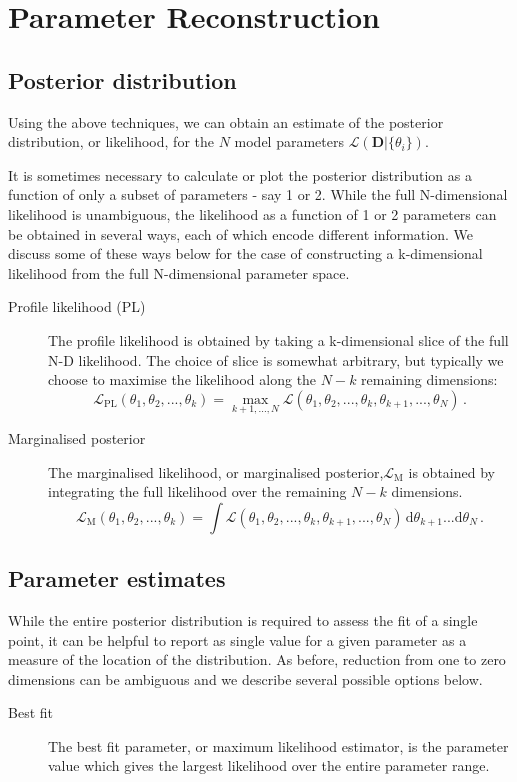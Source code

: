\chapter{Parameter Reconstruction}

\section{Posterior distribution}

Using the above techniques, we can obtain an estimate of the posterior distribution, or likelihood, for the \(N\) model parameters \(\mathcal{L}(\textbf{D}|\{\theta_i\})\).

It is sometimes necessary to calculate or plot the posterior distribution as a function of only a subset of parameters - say 1 or 2. While the full N-dimensional likelihood is unambiguous, the likelihood as a function of 1 or 2 parameters can be obtained in several ways, each of which encode different information. We discuss some of these ways below for the case of constructing a k-dimensional likelihood from the full N-dimensional parameter space.

\begin{description}
\item[Profile likelihood (PL)] The profile likelihood is obtained by taking a k-dimensional slice of the full N-D likelihood. The choice of slice is somewhat arbitrary, but typically we choose to maximise the likelihood along the \(N-k\) remaining dimensions:
\begin{equation}
\mathcal{L}_{\textrm{PL}}(\theta_1,\theta_2,...,\theta_k) = \max_{k+1,...,N} \mathcal{L}(\theta_1,\theta_2,...,\theta_k,\theta_{k+1},...,\theta_N)\,.
\end{equation}
\item[Marginalised posterior] The marginalised likelihood, or marginalised posterior,\(\mathcal{L}_{\textrm{M}}\) is obtained by integrating the full likelihood over the remaining \(N-k\) dimensions.
\begin{equation}
\mathcal{L}_\textrm{M}(\theta_1,\theta_2,...,\theta_k) = \int \mathcal{L}(\theta_1,\theta_2,...,\theta_k,\theta_{k+1},...,\theta_N) \, \textrm{d}\theta_{k+1} ... \textrm{d}\theta_N \,.
\end{equation}
\end{description}

\section{Parameter estimates}

While the entire posterior distribution is required to assess the fit of a single point, it can be helpful to report as single value for a given parameter as a measure of the location of the distribution. As before, reduction from one to zero dimensions can be ambiguous and we describe several possible options below.

\begin{description}
\item[Best fit] The best fit parameter, or maximum likelihood estimator, is the parameter value which gives the largest likelihood over the entire parameter range.

\end{description}